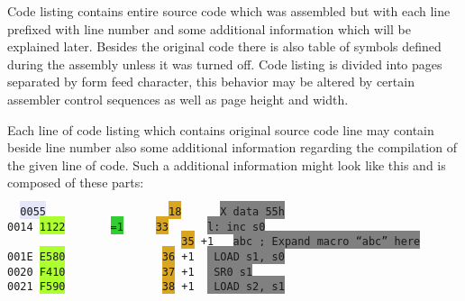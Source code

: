                 Code listing contains entire source code which was assembled but with each line prefixed with line number and some additional information which will be explained later. Besides the original code there is also table of symbols defined during the assembly unless it was turned off. Code listing is divided into pages separated by form feed character, this behavior may be altered by certain assembler control sequences as well as page height and width.

                Each line of code listing which contains original source code line may contain beside line number also some additional information regarding the compilation of the given line of code. Such a additional information might look like this and is composed of these parts:

                \begin{code}[h]
                        \mysmallfont{}
                        \verb'  '\texttt{\colorbox{Lavender}{0055}}\verb'                   '\texttt{\colorbox{Goldenrod}{18}}\verb'      '\texttt{\colorbox{Gray}{X      data     55h}} \\
                        \texttt{\colorbox{Apricot}{0014}}\verb' '\texttt{\colorbox{GreenYellow}{1122}}\verb'       '\texttt{\colorbox{LimeGreen}{=1}}\verb'     '\texttt{\colorbox{Goldenrod}{33}}\verb'      '\texttt{\colorbox{Gray}{l:     inc      s0}} \\
                        \verb'                           '\texttt{\colorbox{Goldenrod}{35}}\verb' '\texttt{\colorbox{ProcessBlue}{+1}}\verb'   '\texttt{\colorbox{Gray}{abc     ; Expand macro ``abc'' here}} \\
                        \texttt{\colorbox{Apricot}{001E}}\verb' '\texttt{\colorbox{GreenYellow}{E580}}\verb'               '\texttt{\colorbox{Goldenrod}{36}}\verb' '\texttt{\colorbox{ProcessBlue}{+1}}\verb'  '\texttt{\colorbox{Gray}{                LOAD     s1, s0}} \\
                        \texttt{\colorbox{Apricot}{0020}}\verb' '\texttt{\colorbox{GreenYellow}{F410}}\verb'               '\texttt{\colorbox{Goldenrod}{37}}\verb' '\texttt{\colorbox{ProcessBlue}{+1}}\verb'  '\texttt{\colorbox{Gray}{                SR0     s1}} \\
                        \texttt{\colorbox{Apricot}{0021}}\verb' '\texttt{\colorbox{GreenYellow}{F590}}\verb'               '\texttt{\colorbox{Goldenrod}{38}}\verb' '\texttt{\colorbox{ProcessBlue}{+1}}\verb'  '\texttt{\colorbox{Gray}{                LOAD     s2, s1}} \\\\

\end{code}
